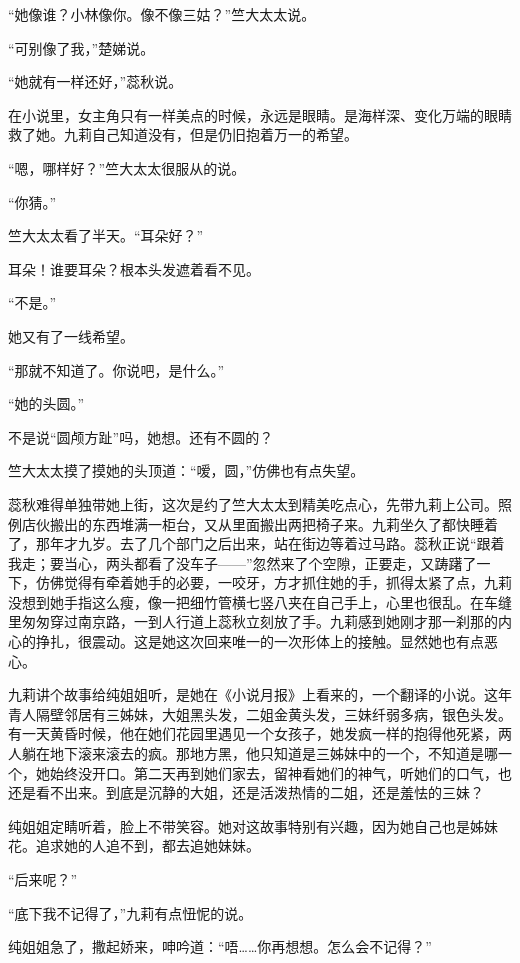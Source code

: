 \par “她像谁？小林像你。像不像三姑？”竺大太太说。
\par “可别像了我，”楚娣说。
\par “她就有一样还好，”蕊秋说。
\par 在小说里，女主角只有一样美点的时候，永远是眼睛。是海样深、变化万端的眼睛救了她。九莉自己知道没有，但是仍旧抱着万一的希望。
\par “嗯，哪样好？”竺大太太很服从的说。
\par “你猜。”
\par 竺大太太看了半天。“耳朵好？”
\par 耳朵！谁要耳朵？根本头发遮着看不见。
\par “不是。”
\par 她又有了一线希望。
\par “那就不知道了。你说吧，是什么。”
\par “她的头圆。”
\par 不是说“圆颅方趾”吗，她想。还有不圆的？
\par 竺大太太摸了摸她的头顶道：“嗳，圆，”仿佛也有点失望。
\par 蕊秋难得单独带她上街，这次是约了竺大太太到精美吃点心，先带九莉上公司。照例店伙搬出的东西堆满一柜台，又从里面搬出两把椅子来。九莉坐久了都快睡着了，那年才九岁。去了几个部门之后出来，站在街边等着过马路。蕊秋正说“跟着我走；要当心，两头都看了没车子——”忽然来了个空隙，正要走，又踌躇了一下，仿佛觉得有牵着她手的必要，一咬牙，方才抓住她的手，抓得太紧了点，九莉没想到她手指这么瘦，像一把细竹管横七竖八夹在自己手上，心里也很乱。在车缝里匆匆穿过南京路，一到人行道上蕊秋立刻放了手。九莉感到她刚才那一刹那的内心的挣扎，很震动。这是她这次回来唯一的一次形体上的接触。显然她也有点恶心。
\par 九莉讲个故事给纯姐姐听，是她在《小说月报》上看来的，一个翻译的小说。这年青人隔壁邻居有三姊妹，大姐黑头发，二姐金黄头发，三妹纤弱多病，银色头发。有一天黄昏时候，他在她们花园里遇见一个女孩子，她发疯一样的抱得他死紧，两人躺在地下滚来滚去的疯。那地方黑，他只知道是三姊妹中的一个，不知道是哪一个，她始终没开口。第二天再到她们家去，留神看她们的神气，听她们的口气，也还是看不出来。到底是沉静的大姐，还是活泼热情的二姐，还是羞怯的三妹？
\par 纯姐姐定睛听着，脸上不带笑容。她对这故事特别有兴趣，因为她自己也是姊妹花。追求她的人追不到，都去追她妹妹。
\par “后来呢？”
\par “底下我不记得了，”九莉有点忸怩的说。
\par 纯姐姐急了，撒起娇来，呻吟道：“唔……你再想想。怎么会不记得？”
